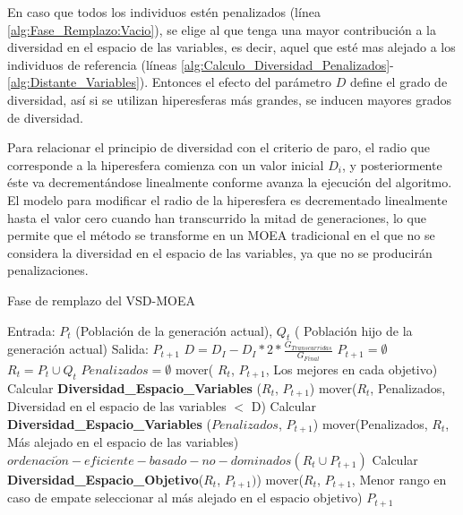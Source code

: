 En caso que todos los individuos estén penalizados (línea \ref{alg:Fase_Remplazo:Vacio}), se elige al que tenga una mayor contribución a la diversidad en el espacio de las variables, es decir, aquel que esté mas alejado a los individuos de referencia (líneas \ref{alg:Calculo_Diversidad_Penalizados}-\ref{alg:Distante_Variables}).
%
Entonces el efecto del parámetro $D$ define el grado de diversidad, así si se utilizan hiperesferas más grandes, se inducen mayores grados de diversidad.

%
Para relacionar el principio de diversidad con el criterio de paro, el radio que corresponde a la hiperesfera comienza con un valor inicial $D_i$, y posteriormente éste va decrementándose linealmente conforme avanza la ejecución del algoritmo.
%
El modelo para modificar el radio de la hiperesfera es decrementado linealmente hasta el valor cero cuando han transcurrido la mitad de generaciones, lo que permite que el método se transforme en un MOEA tradicional en el que no se considera la diversidad en el espacio de las variables, ya que no se producirán penalizaciones.
%

\begin{algorithm}[H]
  \scriptsize
	\caption{Fase de remplazo del VSD-MOEA} 
	\begin{algorithmic}[1]
    	\STATE Entrada: $P_t$ (Población de la generación actual), $Q_t$ ( Población hijo de la generación actual)
    	\STATE Salida: $P_{t+1}$
		\STATE $D = D_I - D_I *2* \frac{G_{Transcurridas}}{G_{Final}}$ \label{DInicial}			
        \label{Modelo}
        \STATE $P_{t+1} = \emptyset$
        \STATE $R_t = P_t \cup Q_t$ \label{alg:Fase_Remplazo:Inicio_Rt}
         \STATE $Penalizados = \emptyset$ \label{alg:Fase_Remplazo:Penalizados_Vacios}
		\STATE mover( $R_t$,  $P_{t+1}$, Los mejores en cada objetivo) \label{alg:Fase_Remplazo:Extremos}
        \label{alg:Extremos}
         \label{alg:Fase_Remplazo:ciclo}
			\STATE Calcular \textbf{Diversidad\_Espacio\_Variables} ($R_t$, $P_{t+1}$) \label{alg:Calculo_Diversidad_Primero}
		\STATE mover($R_t$, Penalizados, Diversidad en el espacio de las variables $ < $ D)  \label{alg:Calculo_Diversidad_Primero_Move}
         \label{alg:Fase_Remplazo:Vacio}
				\STATE Calcular \textbf{Diversidad\_Espacio\_Variables} ($Penalizados$, $P_{t+1}$) \label{alg:Calculo_Diversidad_Penalizados}
				\STATE mover(Penalizados, $R_t$, Más alejado en el espacio de las variables) \label{alg:Distante_Variables}
        \ENDIF
		\STATE $ordenaci \acute{o} n-eficiente-basado-no-dominados(R_t \cup P_{t+1}) $ \label{alg:fast_non_dom}
		\STATE Calcular \textbf{Diversidad\_Espacio\_Objetivo}($R_t$, $P_{t+1})$) \label{alg:Diversidad_Espacio_Objetivo}
        \STATE mover($R_t$, $P_{t+1}$, Menor rango en caso de empate seleccionar al más alejado en el espacio objetivo)  \label{alg:Fase_Remplazo:seleccionarobj}
        \ENDWHILE
	\RETURN $P_{t+1}$
	\end{algorithmic}
    \label{alg:Fase_Remplazo}
\end{algorithm}

